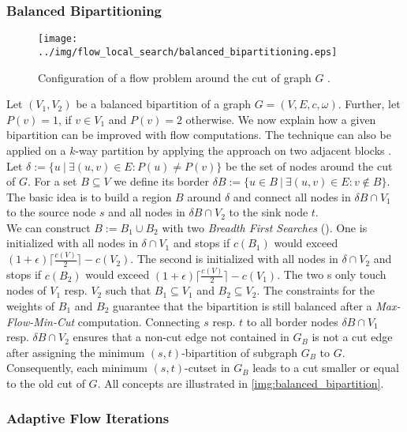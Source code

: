 \subsubsection{Balanced Bipartitioning}
\label{sec:balanced_bipartitioning}
\begin{figure}
\centering
\texttt{[image: ../img/flow\_local\_search/balanced\_bipartitioning.eps]}
\caption{Configuration of a flow problem around the cut of graph $G$ \cite{sanders2011engineering}.}
\label{img:balanced_bipartition}
\end{figure}
Let $(V_1,V_2)$ be a balanced bipartition of a graph $G = (V,E,c,\omega)$. 
Further, let $P(v) = 1$, if $v \in V_1$ and
$P(v) = 2$ otherwise. We now explain how a given bipartition 
can be improved with flow computations. The technique can also be applied on a $k$-way 
partition by applying the approach on two adjacent blocks \cite{sanders2011engineering}. \\
Let $\delta := \{ u\ |\ \exists (u,v) \in E: P(u) \neq P(v) \}$ be the set of nodes
around the cut of $G$. For a set $B \subseteq V$ we define its border 
$\delta B := \{u \in B\ |\ \exists (u,v) \in E: v \notin B\}$.
The basic idea is to build a region $B$ around $\delta$
and connect all nodes in $\delta B \cap V_1$ to the source node $s$ and all nodes in 
$\delta B \cap V_2$ to the sink node $t$. \\
We can construct $B := B_1 \cup B_2$ with two \emph{Breadth First Searches} (\BFS). 
One is initialized with all nodes in $\delta \cap V_1$ and stops if $c(B_1)$ would 
exceed $(1+\epsilon) \lceil \frac{c(V)}{2} \rceil - c(V_2)$. The second is initialized with 
all nodes in $\delta \cap V_2$ and stops if $c(B_2)$ would exceed 
$(1+\epsilon) \lceil \frac{c(V)}{2} \rceil - c(V_1)$. The two \BFS s only touch nodes of $V_1$ resp. $V_2$
such that $B_1 \subseteq V_1$ and $B_2 \subseteq V_2$. The constraints for the weights of $B_1$
and $B_2$ guarantee that the bipartition is still balanced after a \emph{Max-Flow-Min-Cut}
computation. Connecting $s$ resp. $t$ to all border nodes $\delta B \cap V_1$ resp.
$\delta B \cap V_2$ ensures that a non-cut edge not contained in $G_B$ is not a cut edge after
assigning the minimum $(s,t)$-bipartition of subgraph $G_B$ to $G$. Consequently,
each minimum $(s,t)$-cutset in $G_B$ leads to a cut smaller or 
equal to the old cut of $G$. All concepts are illustrated in \autoref{img:balanced_bipartition}.


\subsubsection{Adaptive Flow Iterations}
\label{sec:adaptive_flow_iterations}

